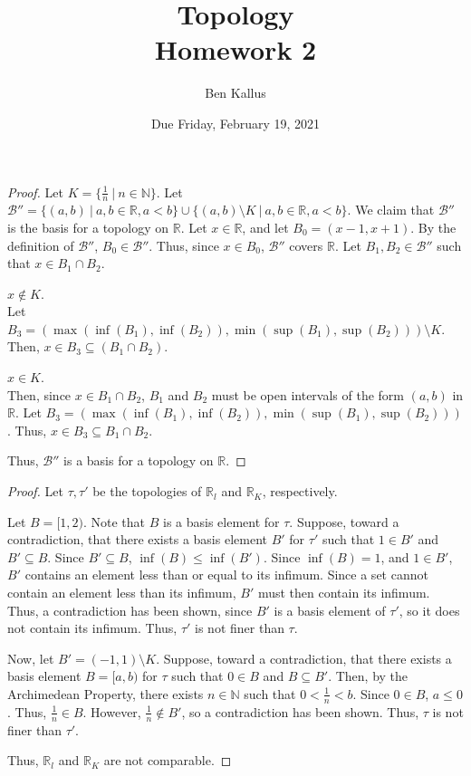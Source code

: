 \documentclass{article}
\date{Due Friday, February 19, 2021}
\author{Ben Kallus}
\title{Topology \\ Homework 2}
\newcommand{\R}{\mathbb R}
\newcommand{\N}{\mathbb N}
\newcommand{\B}{\mathcal B}
\begin{document}
\pagecolor{black}
\color{white}
\maketitle

\begin{proof}
    Let $K = \{\frac1n ~|~ n \in \N\}$.
    Let $\B'' = \{(a,b) ~|~ a,b \in \R, a < b\} \cup \{(a,b) \setminus K ~|~ a,b \in \R, a < b\}$.
    We claim that $\B''$ is the basis for a topology on $\R$.
    Let $x \in \R$, and let $B_0 = (x-1,x+1)$.
    By the definition of $\B''$, $B_0 \in \B''$.
    Thus, since $x \in B_0$, $\B''$ covers $\R$.
    Let $B_1, B_2 \in \B''$ such that $x \in B_1 \cap B_2$.
    
     $x \notin K$. \\
    \indent
    Let $B_3 = (\max(\inf(B_1), \inf(B_2)), \min(\sup(B_1), \sup(B_2))) \setminus K$.
    Then, $x \in B_3 \subseteq (B_1 \cap B_2)$.
    
     $x \in K$. \\
    \indent
    Then, since $x \in B_1 \cap B_2$, $B_1$ and $B_2$ must be open intervals of the form $(a,b)$ in $\R$.
    Let $B_3 = (\max(\inf(B_1), \inf(B_2)), \min(\sup(B_1), \sup(B_2)))$.
    Thus, $x \in B_3 \subseteq B_1 \cap B_2$.

    Thus, $\B''$ is a basis for a topology on $\R$.
\end{proof}

\bigskip
{}
\begin{proof}
    Let $\tau, \tau'$ be the topologies of $\R_l$ and $\R_K$, respectively.

    Let $B = [1, 2)$.
    Note that $B$ is a basis element for $\tau$.
    Suppose, toward a contradiction, that there exists a basis element $B'$ for $\tau'$ such that $1 \in B'$ and $B' \subseteq B$.
    Since $B' \subseteq B$, $\inf(B) \leq \inf(B')$.
    Since $\inf(B) = 1$, and $1 \in B'$, $B'$ contains an element less than or equal to its infimum.
    Since a set cannot contain an element less than its infimum, $B'$ must then contain its infimum.
    Thus, a contradiction has been shown, since $B'$ is a basis element of $\tau'$, so it does not contain its infimum.
    Thus, $\tau'$ is not finer than $\tau$.


    Now, let $B' = (-1,1) \setminus K$.
    Suppose, toward a contradiction, that there exists a basis element $B = [a,b)$ for $\tau$ such that $0 \in B$ and $B \subseteq B'$.
    Then, by the Archimedean Property, there exists $n \in \N$ such that $0 < \frac1n < b$.
    Since $0 \in B$, $a \leq 0$.
    Thus, $\frac1n \in B$.
    However, $\frac1n \notin B'$, so a contradiction has been shown.
    Thus, $\tau$ is not finer than $\tau'$.

    Thus, $\R_l$ and $\R_K$ are not comparable.
\end{proof}
\end{document}
